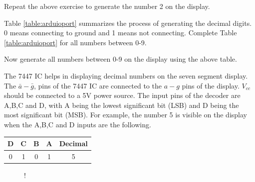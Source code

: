 \begin{problem}
	Repeat the above exercise to generate the number 2 on the display.
\end{problem}	
%
\renewcommand{\thetable}{\theproblem}
\begin{problem}
Table \ref{table:arduioport} summarizes the process of generating the decimal digits.  0 means connecting to ground and 1 means not connecting.  	Complete Table \ref{table:arduioport} for all numbers between 0-9.
\end{problem}	

%
%
\begin{problem}
	Now generate all numbers between  0-9 on the display using the above table.
\end{problem}

%
%
%
The 7447 IC helps in displaying decimal numbers on the seven segment display.  The $\bar{a}-\bar{g}$, pins of the 7447 IC are connected to the $a-g$ pins of the display. $V_{cc}$ should be connected to a 5V power source. The input pins of the decoder are A,B,C and D, with A being the lowest significant bit (LSB) and D being the most significant bit (MSB).  For example, the number 5 is visible on the display when the A,B,C and D inputs are the following.
\begin{center}
	\begin{tabular}{|c|c|c|c|c|}
\hline
D & C & B & A & Decimal
\\ \hline
0 & 1 & 0 & 1 & 5
\\
\hline
\end{tabular}
\end{center}

%
\begin{figure}[!h]
\begin{center}
\resizebox {\columnwidth} {!} {

}
\end{center}
\caption{}
\label{fig:7447}
\end{figure}
%

